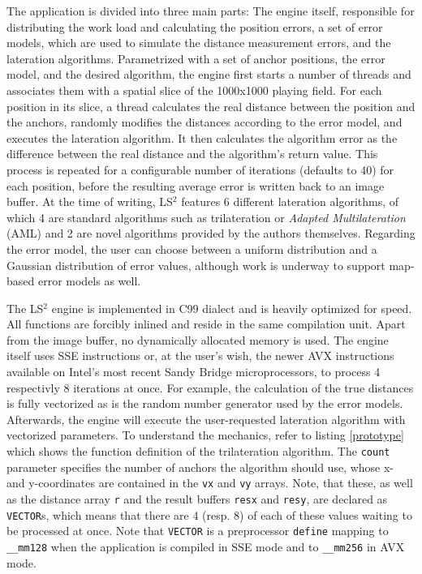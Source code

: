 The application is divided into three main parts: The engine itself, responsible for distributing the work load and calculating the position errors, a set of error models, which are used to simulate the distance measurement errors, and the lateration algorithms. Parametrized with a set of anchor positions, the error model, and the desired algorithm, the engine first starts a number of threads and associates them with a spatial slice of the 1000x1000 playing field. For each position in its slice, a thread calculates the real distance between the position and the anchors, randomly modifies the distances according to the error model, and executes the lateration algorithm. It then calculates the algorithm error as the difference between the real distance and the algorithm's return value. This process is repeated for a configurable number of iterations (defaults to 40) for each position, before the resulting average error is written back to an image buffer. At the time of writing, LS$^{2}$ features 6 different lateration algorithms, of which 4 are standard algorithms such as trilateration or \emph{Adapted Multilateration} (AML) and 2 are novel algorithms provided by the authors themselves. Regarding the error model, the user can choose between a uniform distribution and a Gaussian distribution of error values, although work is underway to support map-based error models as well.

The LS$^{2}$ engine is implemented in C99 dialect and is heavily optimized for speed. All functions are forcibly inlined and reside in the same compilation unit. Apart from the image buffer, no dynamically allocated memory is used. The engine itself uses SSE instructions or, at the user's wish, the newer AVX instructions available on Intel's most recent Sandy Bridge microprocessors, to process 4 respectivly 8 iterations at once. For example, the calculation of the true distances is fully vectorized as is the random number generator used by the error models. Afterwards, the engine will execute the user-requested lateration algorithm with vectorized parameters. To understand the mechanics, refer to listing \ref{prototype} which shows the function definition of the trilateration algorithm. The \texttt{count} parameter specifies the number of anchors the algorithm should use, whose x- and y-coordinates are contained in the \texttt{vx} and \texttt{vy} arrays. Note, that these, as well as the distance array \texttt{r} and the result buffers \texttt{resx} and \texttt{resy}, are declared as \texttt{VECTOR}s, which means that there are 4 (resp. 8) of each of these values waiting to be processed at once. Note that \texttt{VECTOR} is a preprocessor \texttt{define} mapping to \texttt{\_\_mm128} when the application is compiled in SSE mode and to \texttt{\_\_mm256} in AVX mode.

